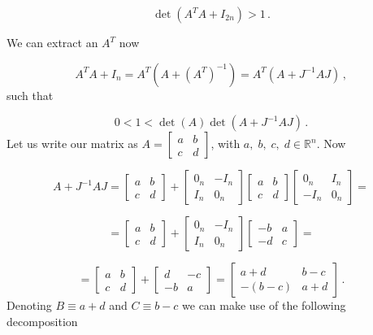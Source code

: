 \documentclass[12pt, class=report, crop=false]{standalone}
\begin{document}
\begin{equation*}
  \det(A^T A + I_{2n}) > 1\,.
\end{equation*}

We can extract an \(A^T\) now

\begin{equation*}
  A^T A +I_n = A^T (A+ (A^T)^{-1}) = A^T (A + J^{-1} A J)\,,
\end{equation*}
such that

\begin{equation}
  \label{ineq:det}
  0 < 1 < \det(A) \det(A + J^{-1} A J)\,.
\end{equation}
Let us write our matrix as \( A=
\begin{bmatrix}
  a & b\\
  c & d
\end{bmatrix}
\), with \(a,\; b,\; c,\; d \in \mathbb{R}^n\). Now

\begin{equation*}
  A + J^{-1} A J =
  \begin{bmatrix}
    a & b\\
    c & d
  \end{bmatrix} +
  \begin{bmatrix}
    0_n & -I_n \\
    I_n & 0_n
  \end{bmatrix}
  \begin{bmatrix}
    a & b\\
    c & d
  \end{bmatrix}
  \begin{bmatrix}
    0_n & I_n \\
    -I_n & 0_n
  \end{bmatrix} =
\end{equation*}

\begin{equation*}
  =
  \begin{bmatrix}
    a & b\\
    c & d
  \end{bmatrix} +
  \begin{bmatrix}
    0_n & -I_n \\
    I_n & 0_n
  \end{bmatrix}
  \begin{bmatrix}
    -b & a\\
    -d & c
  \end{bmatrix} =
\end{equation*}

\begin{equation*}
  =
  \begin{bmatrix}
    a & b\\
    c & d
  \end{bmatrix} +
  \begin{bmatrix}
    d & -c \\
    -b & a
  \end{bmatrix} =
  \begin{bmatrix}
    a+d & b-c\\
    -(b-c) & a+d
  \end{bmatrix}\,.
\end{equation*}
Denoting \(B\equiv a+ d\) and \(C\equiv b-c\) we can make use of the following decomposition
\end{document}
